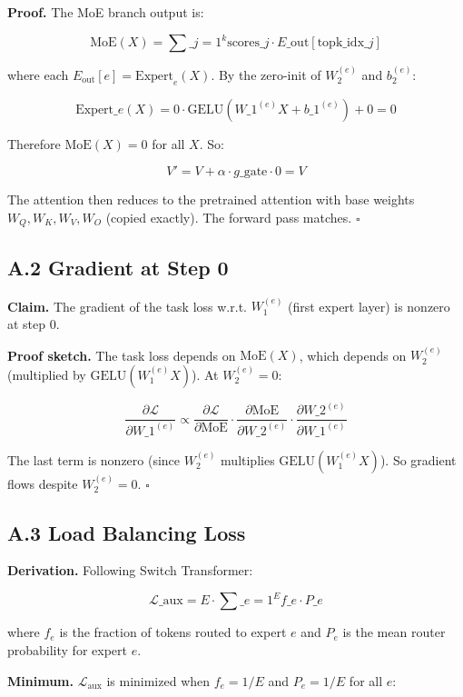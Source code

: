 \textbf{Proof.} The MoE branch output is:

\[
\text{MoE}(X) = \sum\_{j=1}^{k} \text{scores}\_j \cdot E\_{\text{out}}[\text{topk\_idx}\_j]
\]

where each $E_\text{out}[e] = \text{Expert}_e(X)$. By the zero-init of 
$W_2^{(e)}$ and $b_2^{(e)}$:

\[
\text{Expert}\_e(X) = 0 \cdot \text{GELU}(W\_1^{(e)} X + b\_1^{(e)}) + 0 = 0
\]

Therefore $\text{MoE}(X) = 0$ for all $X$. So:

\[
V' = V + \alpha \cdot g\_\text{gate} \cdot 0 = V
\]

The attention then reduces to the pretrained attention with base weights 
$W_Q, W_K, W_V, W_O$ (copied exactly). The forward pass matches. $\square$

\subsection{A.2 Gradient at Step 0}

\textbf{Claim.} The gradient of the task loss w.r.t. $W_1^{(e)}$ (first expert 
layer) is nonzero at step 0.

\textbf{Proof sketch.} The task loss depends on $\text{MoE}(X)$, which depends 
on $W_2^{(e)}$ (multiplied by $\text{GELU}(W_1^{(e)} X)$). At $W_2^{(e)} = 0$:

\[
\frac{\partial \mathcal{L}}{\partial W\_1^{(e)}} \propto \frac{\partial \mathcal{L}}{\partial \text{MoE}} \cdot \frac{\partial \text{MoE}}{\partial W\_2^{(e)}} \cdot \frac{\partial W\_2^{(e)}}{\partial W\_1^{(e)}}
\]

The last term is nonzero (since $W_2^{(e)}$ multiplies $\text{GELU}(W_1^{(e)} X)$). 
So gradient flows despite $W_2^{(e)} = 0$. $\square$

\subsection{A.3 Load Balancing Loss}

\textbf{Derivation.} Following Switch Transformer:

\[
\mathcal{L}\_\text{aux} = E \cdot \sum\_{e=1}^{E} f\_e \cdot P\_e
\]

where $f_e$ is the fraction of tokens routed to expert $e$ and $P_e$ is the 
mean router probability for expert $e$.

\textbf{Minimum.} $\mathcal{L}_\text{aux}$ is minimized when $f_e = 1/E$ and 
$P_e = 1/E$ for all $e$:

